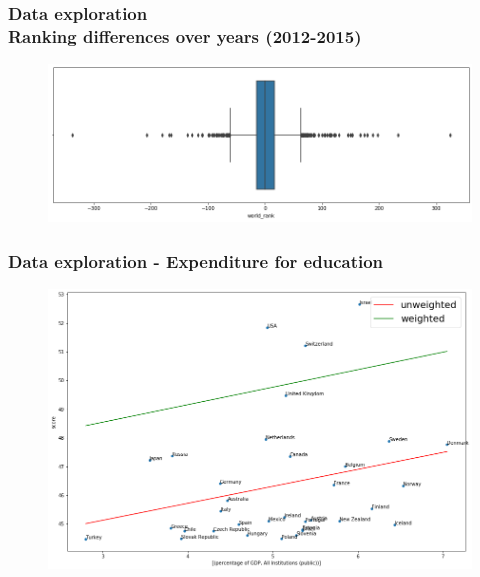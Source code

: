 \documentclass[mathserif,notheorems,11pt]{beamer}
\begin{document}
\begin{frame}
\frametitle{Data exploration\\
Ranking differences over years (2012-2015)}
\begin{figure}
	\centering
	\includegraphics[width=1\linewidth]{graphs/world_rank_diff_bp}
\end{figure}
\end{frame}

\begin{frame}
\frametitle{Data exploration - Expenditure for education}
\begin{figure}
	\centering
	\includegraphics[width=1\linewidth]{graphs/exp_mean_all}
\end{figure}
\end{frame}
\end{document}
